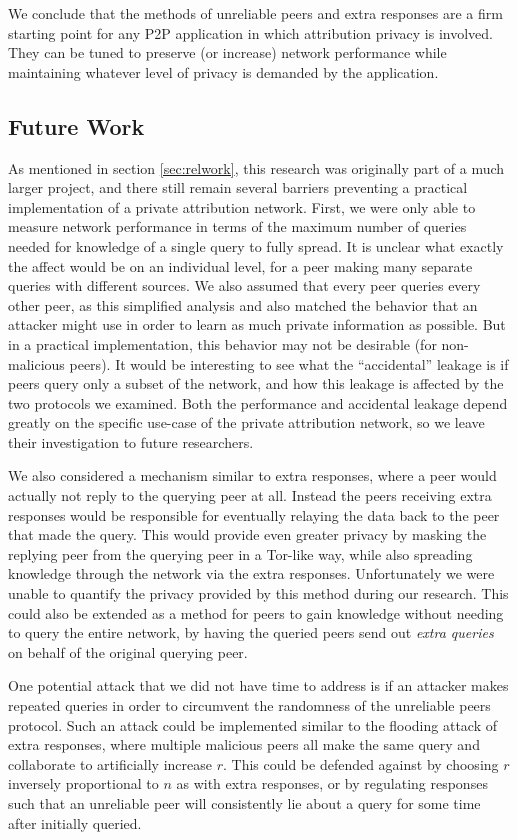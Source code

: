 \documentclass{article}
\newcommand{\secref}[1]{section \ref{sec:#1}}
\begin{document}
We conclude that the methods of unreliable peers and extra responses are a firm
starting point for any P2P application in which attribution privacy is involved.
They can be tuned to preserve (or increase) network performance while
maintaining whatever level of privacy is demanded by the application.

\subsection{Future Work}\label{sec:future}

As mentioned in \secref{relwork}, this research was originally part of a much
larger project, and there still remain several barriers preventing a practical
implementation of a private attribution network. First, we were only able to
measure network performance in terms of the maximum number of queries needed for
knowledge of a single query to fully spread. It is unclear what exactly the
affect would be on an individual level, for a peer making many separate queries
with different sources. We also assumed that every peer queries every other
peer, as this simplified analysis and also matched the behavior that an attacker
might use in order to learn as much private information as possible. But in a
practical implementation, this behavior may not be desirable (for non-malicious
peers). It would be interesting to see what the ``accidental'' leakage is if
peers query only a subset of the network, and how this leakage is affected by
the two protocols we examined. Both the performance and accidental leakage
depend greatly on the specific use-case of the private attribution network, so
we leave their investigation to future researchers.

We also considered a mechanism similar to extra responses, where a peer would
actually not reply to the querying peer at all. Instead the peers receiving
extra responses would be responsible for eventually relaying the data back to
the peer that made the query. This would provide even greater privacy by masking
the replying peer from the querying peer in a Tor-like way, while also spreading
knowledge through the network via the extra responses. Unfortunately we were
unable to quantify the privacy provided by this method during our research. This
could also be extended as a method for peers to gain knowledge without needing
to query the entire network, by having the queried peers send out {\it extra
queries} on behalf of the original querying peer.

One potential attack that we did not have time to address is if an attacker
makes repeated queries in order to circumvent the randomness of the unreliable
peers protocol. Such an attack could be implemented similar to the flooding
attack of extra responses, where multiple malicious peers all make the same
query and collaborate to artificially increase $r$. This could be defended
against by choosing $r$ inversely proportional to $n$ as with extra responses,
or by regulating responses such that an unreliable peer will consistently lie
about a query for some time after initially queried.
\end{document}
